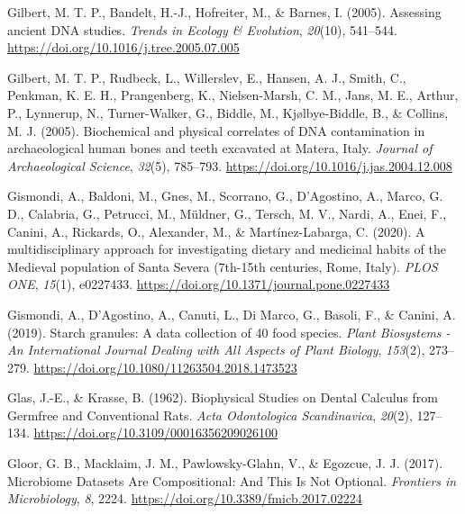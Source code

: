 \documentclass[
  letterpaper,
]{book}
\newlength{\cslhangindent}
\newlength{\cslentryspacingunit} %
\newenvironment{CSLReferences}[2] %
 {%
  \setlength{\parindent}{0pt}
  \ifodd #1
  \let\oldpar\par
  \def\par{\hangindent=\cslhangindent\oldpar}
  \fi
  \setlength{\parskip}{#2\cslentryspacingunit}
 }%
 {}
\begin{document}
\begin{CSLReferences}{1}{0}
\leavevmode{}%
Gilbert, M. T. P., Bandelt, H.-J., Hofreiter, M., \& Barnes, I. (2005).
Assessing ancient {DNA} studies. \emph{Trends in Ecology \& Evolution},
\emph{20}(10), 541--544.
\url{https://doi.org/10.1016/j.tree.2005.07.005}

\leavevmode{}%
Gilbert, M. T. P., Rudbeck, L., Willerslev, E., Hansen, A. J., Smith,
C., Penkman, K. E. H., Prangenberg, K., Nielsen-Marsh, C. M., Jans, M.
E., Arthur, P., Lynnerup, N., Turner-Walker, G., Biddle, M.,
Kjølbye-Biddle, B., \& Collins, M. J. (2005). Biochemical and physical
correlates of {DNA} contamination in archaeological human bones and
teeth excavated at {Matera}, {Italy}. \emph{Journal of Archaeological
Science}, \emph{32}(5), 785--793.
\url{https://doi.org/10.1016/j.jas.2004.12.008}

\leavevmode{}%
Gismondi, A., Baldoni, M., Gnes, M., Scorrano, G., D'Agostino, A.,
Marco, G. D., Calabria, G., Petrucci, M., Müldner, G., Tersch, M. V.,
Nardi, A., Enei, F., Canini, A., Rickards, O., Alexander, M., \&
Martínez-Labarga, C. (2020). A multidisciplinary approach for
investigating dietary and medicinal habits of the {Medieval} population
of {Santa Severa} (7th-15th centuries, {Rome}, {Italy}). \emph{PLOS
ONE}, \emph{15}(1), e0227433.
\url{https://doi.org/10.1371/journal.pone.0227433}

\leavevmode{}%
Gismondi, A., D'Agostino, A., Canuti, L., Di Marco, G., Basoli, F., \&
Canini, A. (2019). Starch granules: A data collection of 40 food
species. \emph{Plant Biosystems - An International Journal Dealing with
All Aspects of Plant Biology}, \emph{153}(2), 273--279.
\url{https://doi.org/10.1080/11263504.2018.1473523}

\leavevmode{}%
Glas, J.-E., \& Krasse, B. (1962). Biophysical {Studies} on {Dental
Calculus} from {Germfree} and {Conventional Rats}. \emph{Acta
Odontologica Scandinavica}, \emph{20}(2), 127--134.
\url{https://doi.org/10.3109/00016356209026100}

\leavevmode{}%
Gloor, G. B., Macklaim, J. M., Pawlowsky-Glahn, V., \& Egozcue, J. J.
(2017). Microbiome {Datasets Are Compositional}: {And This Is Not
Optional}. \emph{Frontiers in Microbiology}, \emph{8}, 2224.
\url{https://doi.org/10.3389/fmicb.2017.02224}


\end{CSLReferences}
\end{document}

